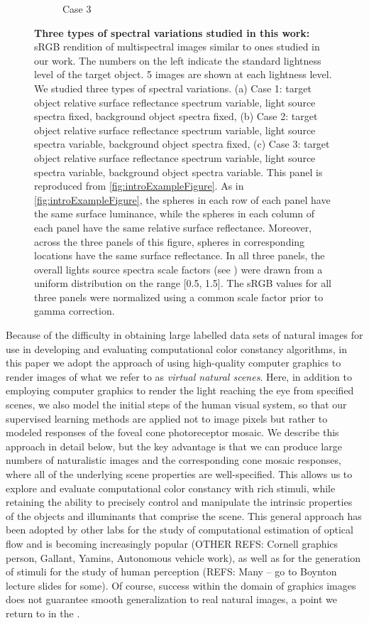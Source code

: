 \documentclass{jov}
\begin{document}
\begin{figure}
\begin{subfigure}[b]{0.33 \textwidth}
        \caption{Case 3}
        \label{fig:allSpectraVarying}
    \end{subfigure}    
    \caption{{\bf Three types of spectral variations studied in this work:} sRGB rendition of multispectral images similar to ones studied in our work. The numbers on the left indicate the standard lightness level of the target object. 5 images are shown at each lightness level. We studied three types of spectral variations. (a) Case 1: target object relative surface reflectance spectrum variable, light source spectra fixed, background object spectra fixed, (b) Case 2: target object relative surface reflectance spectrum variable, light source spectra variable, background object spectra fixed, (c) Case 3: target object relative surface reflectance spectrum variable, light source spectra variable, background object spectra variable. This panel is reproduced from \ref{fig:introExampleFigure}. As in \ref{fig:introExampleFigure}, the spheres in each row of each panel have the same surface luminance, while the spheres in each column of each panel have the same relative surface reflectance.  Moreover, across the three panels of this figure, spheres in corresponding locations have the same surface reflectance. In all three panels, the overall lights source spectra scale factors (see ) were drawn from a uniform distribution on the range [0.5, 1.5]. The sRGB values for all three panels were normalized using a common scale factor prior to gamma correction.} 
\label{fig:studiedCases}
\end{figure}

Because of the difficulty in obtaining large labelled data sets of natural images for use in developing and evaluating computational color constancy algorithms, in this paper we adopt the approach of using high-quality computer graphics to render images of what we refer to as {\em virtual natural scenes}. Here, in addition to employing computer graphics to render the light reaching the eye from specified scenes, we also model the initial steps of the human visual system, so that our supervised learning methods are applied not to image pixels but rather to modeled responses of the foveal cone photoreceptor mosaic. We describe this approach in detail below, but the key advantage is that we can produce large numbers of naturalistic images and the corresponding cone mosaic responses, where all of the underlying scene properties are well-specified. This allows us to explore and evaluate computational color constancy with rich stimuli, while retaining the ability to precisely control and manipulate the intrinsic properties of the objects and illuminants that comprise the scene. This general approach has been adopted by other labs for the study of computational estimation of optical flow \cite{baker2011database} and is becoming increasingly popular (OTHER REFS: Cornell graphics person, Gallant, Yamins, Autonomous vehicle work), as well as for the generation of stimuli for the study of human perception \cite{boyaci2003effect}(REFS: Many -- go to Boynton lecture slides for some).  Of course, success within the domain of graphics images does not guarantee smooth generalization to real natural images, a point we return to in the .
\end{document}
